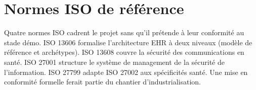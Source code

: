 \section{Normes ISO de référence}
\label{sec:iso-reference}

Quatre normes ISO cadrent le projet sans qu'il prétende à leur conformité au stade démo. ISO 13606 \cite{iso_13606} formalise l'architecture EHR à deux niveaux (modèle de référence et archétypes). ISO 13608 \cite{iso_13608} couvre la sécurité des communications en santé. ISO 27001 \cite{iso_27001} structure le système de management de la sécurité de l'information. ISO 27799 \cite{iso_27799} adapte ISO 27002 aux spécificités santé. Une mise en conformité formelle ferait partie du chantier d'industrialisation.
